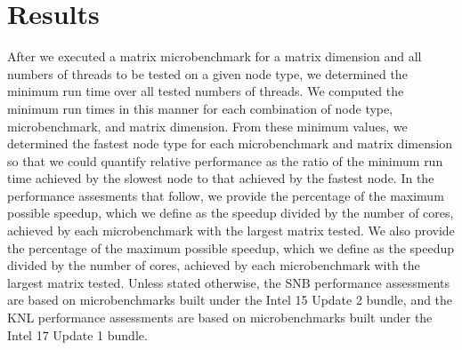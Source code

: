 \section{Results} \label{sec:results}
After we executed a matrix microbenchmark for a matrix dimension and all numbers
  of threads to be tested on a given node type, we determined the minimum run
  time over all tested numbers of threads.
We computed the minimum run times in this manner for each combination of node
  type, microbenchmark, and matrix dimension.
From these minimum values, we determined the fastest node type for each
  microbenchmark and matrix dimension so that we could quantify relative
  performance as the ratio of the minimum run time achieved by the slowest node
  to that achieved by the fastest node.
In the performance assesments that follow, we provide the percentage of the
  maximum possible speedup, which we define as the speedup divided by the number
  of cores, achieved by each microbenchmark with the largest matrix tested.
We also provide the percentage of the maximum possible speedup, which we define
  as the speedup divided by the number of cores, achieved by each microbenchmark
  with the largest matrix tested.
Unless stated otherwise, the SNB performance assessments are based on
  microbenchmarks built under the Intel 15 Update 2 bundle, and the KNL
  performance assessments are based on microbenchmarks built under the Intel 17
  Update 1 bundle.

